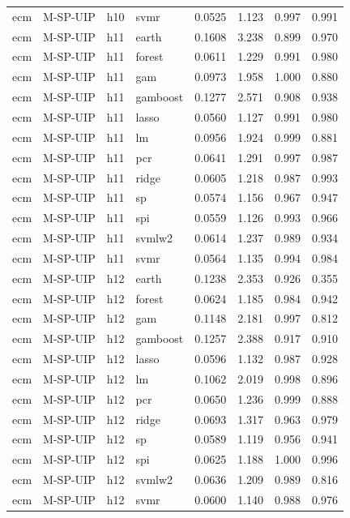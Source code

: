 \begin{ThreePartTable}
\begin{longtable}[t]{llclcccc}
ecm & M-SP-UIP & h10 & svmr & 0.0525 & 1.123 & 0.997 & 0.991\\
\addlinespace
ecm & M-SP-UIP & h11 & earth & 0.1608 & 3.238 & 0.899 & 0.970\\
ecm & M-SP-UIP & h11 & forest & 0.0611 & 1.229 & 0.991 & 0.980\\
ecm & M-SP-UIP & h11 & gam & 0.0973 & 1.958 & 1.000 & 0.880\\
ecm & M-SP-UIP & h11 & gamboost & 0.1277 & 2.571 & 0.908 & 0.938\\
ecm & M-SP-UIP & h11 & lasso & 0.0560 & 1.127 & 0.991 & 0.980\\
ecm & M-SP-UIP & h11 & lm & 0.0956 & 1.924 & 0.999 & 0.881\\
ecm & M-SP-UIP & h11 & pcr & 0.0641 & 1.291 & 0.997 & 0.987\\
ecm & M-SP-UIP & h11 & ridge & 0.0605 & 1.218 & 0.987 & 0.993\\
ecm & M-SP-UIP & h11 & sp & 0.0574 & 1.156 & 0.967 & 0.947\\
ecm & M-SP-UIP & h11 & spi & 0.0559 & 1.126 & 0.993 & 0.966\\
ecm & M-SP-UIP & h11 & svmlw2 & 0.0614 & 1.237 & 0.989 & 0.934\\
ecm & M-SP-UIP & h11 & svmr & 0.0564 & 1.135 & 0.994 & 0.984\\
\addlinespace
ecm & M-SP-UIP & h12 & earth & 0.1238 & 2.353 & 0.926 & 0.355\\
ecm & M-SP-UIP & h12 & forest & 0.0624 & 1.185 & 0.984 & 0.942\\
ecm & M-SP-UIP & h12 & gam & 0.1148 & 2.181 & 0.997 & 0.812\\
ecm & M-SP-UIP & h12 & gamboost & 0.1257 & 2.388 & 0.917 & 0.910\\
ecm & M-SP-UIP & h12 & lasso & 0.0596 & 1.132 & 0.987 & 0.928\\
ecm & M-SP-UIP & h12 & lm & 0.1062 & 2.019 & 0.998 & 0.896\\
ecm & M-SP-UIP & h12 & pcr & 0.0650 & 1.236 & 0.999 & 0.888\\
ecm & M-SP-UIP & h12 & ridge & 0.0693 & 1.317 & 0.963 & 0.979\\
ecm & M-SP-UIP & h12 & sp & 0.0589 & 1.119 & 0.956 & 0.941\\
ecm & M-SP-UIP & h12 & spi & 0.0625 & 1.188 & 1.000 & 0.996\\
ecm & M-SP-UIP & h12 & svmlw2 & 0.0636 & 1.209 & 0.989 & 0.816\\
ecm & M-SP-UIP & h12 & svmr & 0.0600 & 1.140 & 0.988 & 0.976\\

\end{longtable}
\end{ThreePartTable}
